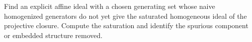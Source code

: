 \begin{problem}\label{chal:vi37-02}
Find an explicit affine ideal with a chosen generating set whose naive homogenized generators do not yet give the saturated homogeneous ideal of the projective closure. Compute the saturation and identify the spurious component or embedded structure removed.
\end{problem}
